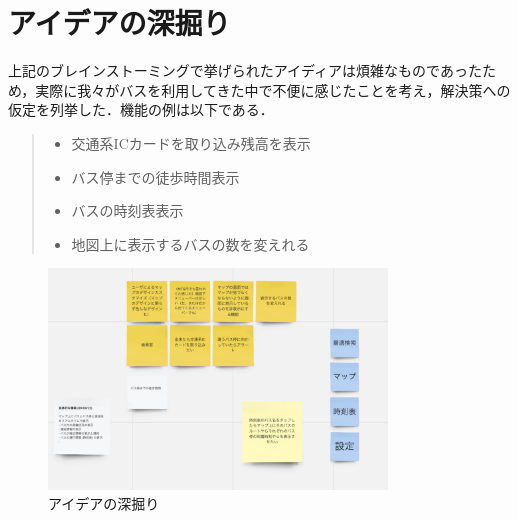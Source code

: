 \section{アイデアの深掘り}

上記のブレインストーミングで挙げられたアイディアは煩雑なものであったため，実際に我々がバスを利用してきた中で不便に感じたことを考え，解決策への仮定を列挙した．機能の例は以下である．

\begin{quote}
    \begin{itemize}
        \item 交通系ICカードを取り込み残高を表示
        \item バス停までの徒歩時間表示
        \item バスの時刻表表示
        \item 地図上に表示するバスの数を変えれる
    \end{itemize}
\end{quote}

\begin{figure}[htbp]
    \centering
    \includegraphics[width=9cm]{images/dig.png}
    \caption{アイデアの深掘り}
    \label{fig:dig}
\end{figure}

